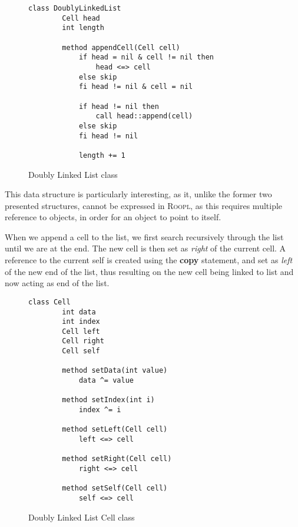 \begin{figure}[ht!]
    \centering
    \begin{lstlisting}[style = basic, language = roopl] 
    class DoublyLinkedList
        Cell head
        int length
    
        method appendCell(Cell cell)
            if head = nil & cell != nil then
                head <=> cell
            else skip
            fi head != nil & cell = nil
    
            if head != nil then 
                call head::append(cell)
            else skip
            fi head != nil
    
            length += 1
    \end{lstlisting}
    \caption{Doubly Linked List class}
    \label{fig:doubly-linked-list-class}
\end{figure}

This data structure is particularly interesting, as it, unlike the former two presented structures, cannot be expressed in \textsc{Roopl}, as this requires multiple reference to objects, in order for an object to point to itself.

When we append a cell to the list, we first search recursively through the list until we are at the end. The new cell is then set as \textit{right} of the current cell. A reference to the current self is created using the \textbf{copy} statement, and set as \textit{left} of the new end of the list, thus resulting on the new cell being linked to list and now acting as end of the list.

\begin{figure}[ht!]
    \centering
    \begin{lstlisting}[style = basic, language = roopl] 
        class Cell
        int data
        int index
        Cell left
        Cell right
        Cell self
    
        method setData(int value)
            data ^= value
    
        method setIndex(int i)
            index ^= i    
    
        method setLeft(Cell cell)
            left <=> cell
    
        method setRight(Cell cell)
            right <=> cell
    
        method setSelf(Cell cell)
            self <=> cell
    \end{lstlisting}
    \caption{Doubly Linked List Cell class}
    \label{fig:doubly-linked-list-cell-class}
\end{figure}

